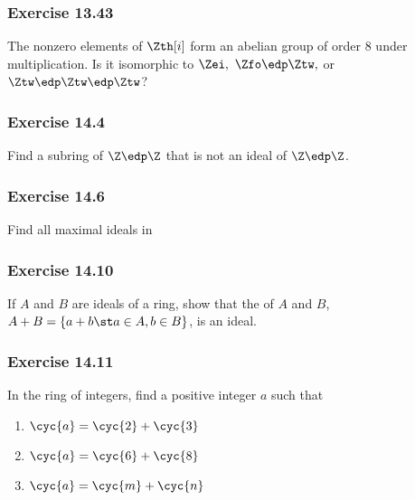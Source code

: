 \documentclass{article}
\begin{document}
\subsubsection*{Exercise 13.43}
The nonzero elements of \( \Zth[i] \) form an abelian group of order 8 under multiplication. Is it isomorphic to \( \Zei,\ \Zfo\edp\Ztw, \) or \( \Ztw\edp\Ztw\edp\Ztw \)?

\begin{solution} %
\end{solution}

\subsubsection*{Exercise 14.4}
Find a subring of \( \Z\edp\Z \) that is not an ideal of \( \Z\edp\Z \).

\begin{solution} %
\end{solution}

\subsubsection*{Exercise 14.6}
Find all maximal ideals in

 \Zei \qquad {}  \qquad {}  \qquad {}\Zn

\begin{solution} %
\end{solution}

\subsubsection*{Exercise 14.10}
If \( A \) and \( B \) are ideals of a ring, show that the  of \( A \) and \( B \), \( A+B = \{a+b\st a\in A,b\in B\} \), is an ideal.

\begin{solution} %
\end{solution}


\subsubsection*{Exercise 14.11}
In the ring of integers, find a positive integer \( a \) such that
\begin{enumerate}[label=\bd{\alph*.}]
  \item \( \cyc{a} = \cyc{2} + \cyc{3} \)
  \item \( \cyc{a} = \cyc{6} + \cyc{8} \)
  \item \( \cyc{a} = \cyc{m} + \cyc{n} \)
\end{enumerate}
\end{document}
